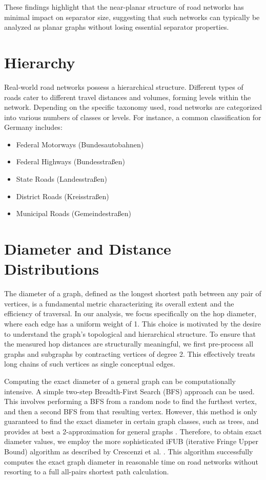 These findings highlight that the near-planar structure of road networks has minimal impact on separator size, suggesting that such networks can typically be analyzed as planar graphs without losing essential separator properties.

\section{Hierarchy}
\label{sec:hierarchy}

Real-world road networks possess a hierarchical structure.
Different types of roads cater to different travel distances and volumes, forming levels within the network.
Depending on the specific taxonomy used, road networks are categorized into various numbers of classes or levels.
For instance, a common classification for Germany includes:

\begin{itemize}
    \item Federal Motorways (Bundesautobahnen)
    \item Federal Highways (Bundesstraßen)
    \item State Roads (Landesstraßen)
    \item District Roads (Kreisstraßen)
    \item Municipal Roads (Gemeindestraßen)
\end{itemize}

\section{Diameter and Distance Distributions}
\label{sec:diameter}

The diameter of a graph, defined as the longest shortest path between any pair of vertices, is a fundamental metric characterizing its overall extent and the efficiency of traversal.
In our analysis, we focus specifically on the hop diameter, where each edge has a uniform weight of 1.
This choice is motivated by the desire to understand the graph's topological and hierarchical structure.
To ensure that the measured hop distances are structurally meaningful, we first pre-process all graphs and subgraphs by contracting vertices of degree 2.
This effectively treats long chains of such vertices as single conceptual edges.

Computing the exact diameter of a general graph can be computationally intensive.
A simple two-step Breadth-First Search (BFS) approach can be used. This involves performing a BFS from a random node to find the furthest vertex, and then a second BFS from that resulting vertex. However, this method is only guaranteed to find the exact diameter in certain graph classes, such as trees, and provides at best a 2-approximation for general graphs \cite{aingworth_fast_1999}.
Therefore, to obtain exact diameter values, we employ the more sophisticated iFUB (iterative Fringe Upper Bound) algorithm as described by Crescenzi et al. \cite{crescenzi_computing_2013}.
This algorithm successfully computes the exact graph diameter in reasonable time on road networks without resorting to a full all-pairs shortest path calculation.

